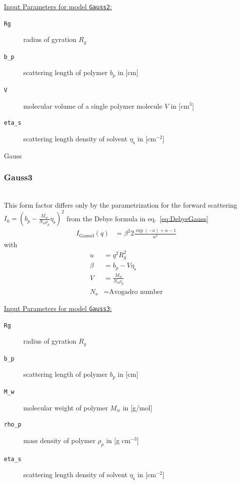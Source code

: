 \vspace{5mm}
\uline{Input Parameters for model \texttt{Gauss2}:}
\begin{description}
\item[\texttt{Rg}] radius of gyration $R_g$
\item[\texttt{b\_p}] scattering length of polymer $b_p$ in [cm]
\item[\texttt{V}] molecular volume of a single polymer molecule $V$ in [cm$^3$]
\item[\texttt{eta\_s}] scattering length density of solvent $\eta_\text{s}$ in [cm$^{-2}$]
\end{description}

\textcolor[rgb]{1.00,1.00,1.00}{Gauss}\\
\subsubsection{Gauss3}
\label{sect:Gauss3}
~\\
This form factor  \cite{Debye1947} differs only by the parametrization for the forward scattering
$I_0=(b_p-\frac{M_w}{N_a\rho_p}\eta_\text{s})^2$ from the Debye formula in eq.\ \ref{eq:DebyeGauss}
\begin{align}
I_\text{Gauss3}(q) &= \beta^2 2\frac{\exp(-u)+u-1}{u^2}
\end{align}
with
\begin{align}
u &= q^2R_g^2 \nonumber \\
\beta &= b_p-V\eta_\text{s} \nonumber\\
V &= \frac{M_w}{N_a\rho_p} \nonumber \\
N_a &= \mbox{Avogadro number} \nonumber
\end{align}

\uline{Input Parameters for model \texttt{Gauss3}:}
\begin{description}
\item[\texttt{Rg}] radius of gyration $R_g$
\item[\texttt{b\_p}] scattering length of polymer $b_p$ in [cm]
\item[\texttt{M\_w}] molecular weight of polymer $M_w$ in [g/mol]
\item[\texttt{rho\_p}] mass density of polymer $\rho_p$ in [g cm$^{-3}$]
\item[\texttt{eta\_s}] scattering length density of solvent $\eta_\text{s}$ in [cm$^{-2}$]
\end{description}


